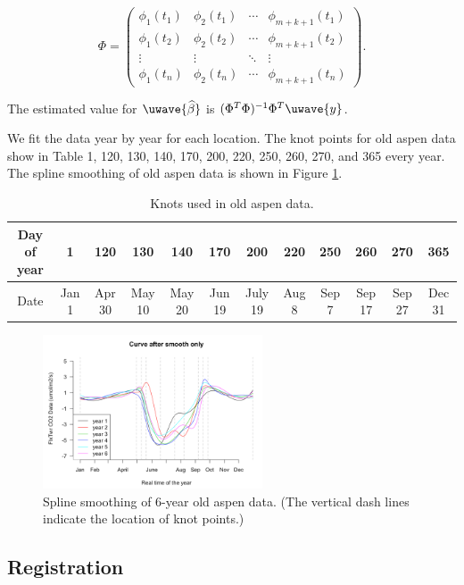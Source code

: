 \documentclass{article}
\begin{document}
\begin{equation}
\Phi=
  \begin{pmatrix}
  \phi_1(t_1) & \phi_2(t_1) & \cdots & \phi_{m+k+1}(t_1) \\
  \phi_1(t_2) & \phi_2(t_2) & \cdots & \phi_{m+k+1}(t_2) \\
  \vdots & \vdots & \ddots & \vdots \\
  \phi_1(t_n) & \phi_2(t_n) & \cdots & \phi_{m+k+1}(t_n)
  \end{pmatrix}.
\end{equation}

The estimated value for $\uwave{\widehat{\beta}}$  is $(\Phi^T\Phi)^{-1}\Phi^T\uwave{y}$.

We fit the data year by year for each location.
The knot points for old aspen data show in Table  1, 120, 130, 140, 170, 200, 220, 250, 260, 270, and 365 every year. 
The spline smoothing of old aspen data is shown in Figure \ref{Fig:smoothOA}. 


\begin{table}[!ht]
\caption{Knots used in old aspen data.}\label{Tab:knots}
\centering
\def\arraystretch{1.5}
\begin{tabular}{|c|ccccccccccc|}
\hline
Day of year & 1 & 120 & 130 & 140 & 170 & 200 & 220 & 250 & 260 & 270 & 365\\ \hline
Date & Jan 1 & Apr 30 & May 10 & May 20 & Jun 19 & July 19 & Aug 8 & Sep 7  & Sep 17 & Sep 27 & Dec 31\\ \hline
\end{tabular}
\end{table}

\begin{figure}[!ht]
\centering
\includegraphics[width=0.58\textwidth]{Original2.png}
\caption{Spline smoothing of 6-year old aspen data. (The vertical dash lines indicate the location of knot points.)}\label{Fig:smoothOA}
\end{figure}

\subsection{Registration}\label{Sec:Regi}
\end{document}
